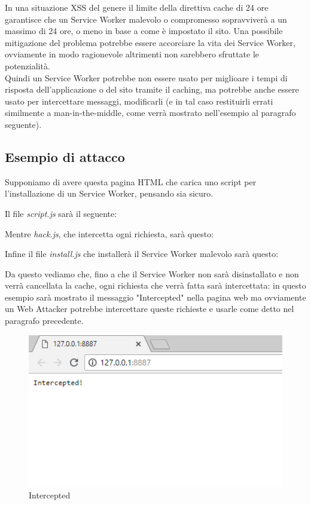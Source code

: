 \documentclass[11pt ,a4paper , twoside , openright ]{book}
\begin{document}
	In una situazione XSS del genere il limite della direttiva cache di 24 ore garantisce che un Service Worker malevolo o compromesso sopravviverà a un massimo di 24 ore, o meno in base a come è impostato il sito. Una possibile mitigazione del problema potrebbe essere accorciare la vita dei Service Worker, ovviamente in modo ragionevole altrimenti non sarebbero sfruttate le potenzialità.
	\\
	Quindi un Service Worker potrebbe non essere usato per miglioare i tempi di risposta dell'applicazione o del sito tramite il caching, ma potrebbe anche essere usato per intercettare messaggi, modificarli (e in tal caso restituirli errati similmente a man-in-the-middle, come verrà mostrato nell'esempio al paragrafo seguente).
	\newpage
	\subsection{Esempio di attacco}
	Supponiamo di avere questa pagina HTML che carica uno script per l'installazione di un Service Worker, pensando sia sicuro.
	
	Il file \textit{script.js} sarà il seguente:
	
	\pagebreak
	Mentre \textit{hack.js}, che intercetta ogni richiesta, sarà questo:
	
	Infine il file \textit{install.js} che installerà il Service Worker malevolo sarà questo:
	
	Da questo vediamo che, fino a che il Service Worker non sarà disinstallato e non verrà cancellata la cache, ogni richiesta che verrà fatta sarà intercettata: in questo esempio sarà mostrato il messaggio "Intercepted" nella pagina web ma ovviamente un Web Attacker potrebbe intercettare queste richieste e usarle come detto nel paragrafo precedente.
	\begin{figure}[h]
		\centering
		\includegraphics[width=0.7\linewidth]{Intercepted}
		\caption{Intercepted}
		\label{fig: Intercepted}
	\end{figure}
	
\end{document}
